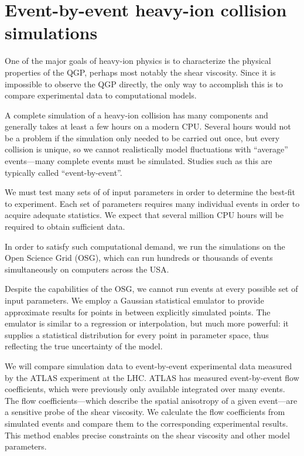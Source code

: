 \documentclass[twocolumn,10pt,amsmath]{revtex4-1}
\begin{document}
\section{Event-by-event heavy-ion collision simulations}

One of the major goals of heavy-ion physics is to characterize the physical properties of the QGP, perhaps most notably the shear viscosity.  Since it is
impossible to observe the QGP directly, the only way to accomplish this is to compare experimental data to computational models.


A complete simulation of a heavy-ion collision has many components and generally takes at least a few hours on a modern CPU.  Several hours would not be a
problem if the simulation only needed to be carried out once, but every collision is unique, so we cannot realistically model fluctuations with ``average''
events---many complete events must be simulated.  Studies such as this are typically called ``event-by-event''.

We must test many sets of of input parameters in order to determine the best-fit to experiment.  Each set of parameters requires many individual events in order
to acquire adequate statistics.  We expect that several million CPU hours will be required to obtain sufficient data.

In order to satisfy such computational demand, we run the simulations on the Open Science Grid (OSG), which can run hundreds or thousands of events simultaneously on
computers across the USA.

Despite the capabilities of the OSG, we cannot run events at every possible set of input parameters.  We employ a Gaussian statistical emulator to provide
approximate results for points in between explicitly simulated points.  The emulator is similar to a regression or interpolation, but much more powerful:  it supplies
a statistical distribution for every point in parameter space, thus reflecting the true uncertainty of the model.

We will compare simulation data to event-by-event experimental data measured by the ATLAS experiment at the LHC.  ATLAS has measured event-by-event flow
coefficients, which were previously only available integrated over many events.  The flow coefficients---which describe the spatial anisotropy of a given
event---are a sensitive probe of the shear viscosity.   We calculate the flow coefficients from simulated events and compare them
to the corresponding experimental results.
This method enables precise constraints on the shear viscosity and other model
parameters.
\end{document}

